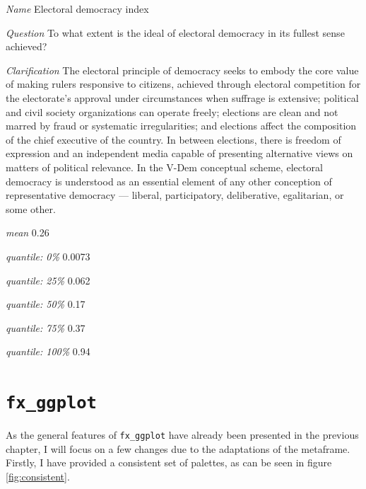 \documentclass[]{report}
\theoremstyle{definition}
\theoremstyle{definition}
\theoremstyle{definition}
\theoremstyle{remark}
\begin{document}
\emph{Name} Electoral democracy index

\emph{Question} To what extent is the ideal of electoral democracy in
its fullest sense achieved?

\emph{Clarification} The electoral principle of democracy seeks to
embody the core value of making rulers responsive to citizens, achieved
through electoral competition for the electorate's approval under
circumstances when suffrage is extensive; political and civil society
organizations can operate freely; elections are clean and not marred by
fraud or systematic irregularities; and elections affect the composition
of the chief executive of the country. In between elections, there is
freedom of expression and an independent media capable of presenting
alternative views on matters of political relevance. In the V-Dem
conceptual scheme, electoral democracy is understood as an essential
element of any other conception of representative democracy --- liberal,
participatory, deliberative, egalitarian, or some other.

\emph{mean} 0.26

\emph{quantile: 0\%} 0.0073

\emph{quantile: 25\%} 0.062

\emph{quantile: 50\%} 0.17

\emph{quantile: 75\%} 0.37

\emph{quantile: 100\%} 0.94

\hypertarget{fx_ggplot}{\section{\texorpdfstring{\texttt{fx\_ggplot}}{fx\_ggplot}}\label{fx_ggplot}}

As the general features of \texttt{fx\_ggplot} have already been
presented in the previous chapter, I will focus on a few changes due to
the adaptations of the metaframe. Firstly, I have provided a consistent
set of palettes, as can be seen in figure \ref{fig:consistent}.
\end{document}

